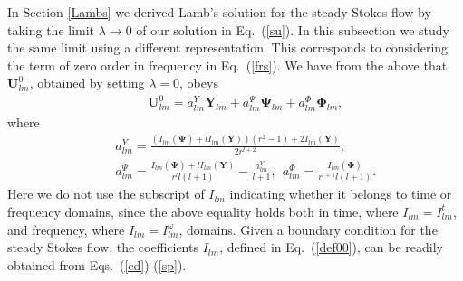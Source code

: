 \documentclass[aps,prx,twocolumn,amsmath,amssymb,amsfonts]{revtex4-2}
\begin{document}
{In Section \ref{Lambs} we derived Lamb's solution for the steady Stokes flow by taking the limit $\lambda\to 0$ of our solution in Eq.~(\ref{su}). In this subsection we study the same limit using a different representation. This corresponds to considering the term of zero order in frequency in Eq.~(\ref{frs}). We have from the above that $\bm U_{lm}^0$, obtained by setting $\lambda=0$, obeys
\begin{eqnarray}&&
\bm U_{lm}^0 = a_{lm}^{Y}\bm Y_{lm} +  a_{lm}^{\Psi}\bm \Psi_{lm} +  a_{lm}^{\Phi}\bm \Phi_{lm},
\label{uge0}
\end{eqnarray}
where
\begin{eqnarray}&&
a_{lm}^{Y} = \frac{ (I_{lm}(\bm \Psi) + l I_{lm}(\bm Y))(r^2-1)+2I_{lm}(\bm Y)}{2r^{l+2}},
\label{uge1}\\&&
a_{lm}^{\Psi} \!=\!\frac{I_{lm}(\bm \Psi) \!+\! l I_{lm}(\bm Y)}{r^{l}l(l\!+\!1)}
\!-\!\frac{a_{lm}^{Y}}{l\!+\!1}, \ \ a_{lm}^{\Phi}\! =\!  \frac{I_{lm}(\bm \Phi) }{r^{l+1}l(l\!+\!1)}.
\nonumber
\end{eqnarray}
Here we do not use the subscript of $I_{lm}$ indicating whether it belongs to time or frequency domains, since the above equality holds both in time, where $I_{lm}=I_{lm}^t$, and frequency, where $I_{lm}=I_{lm}^{\omega}$, domains. Given a boundary condition for the steady Stokes flow, the coefficients $I_{lm}$, defined in Eq.~(\ref{def00}), can be readily obtained from Eqs.~(\ref{cd})-(\ref{sp}).

}
\end{document}
